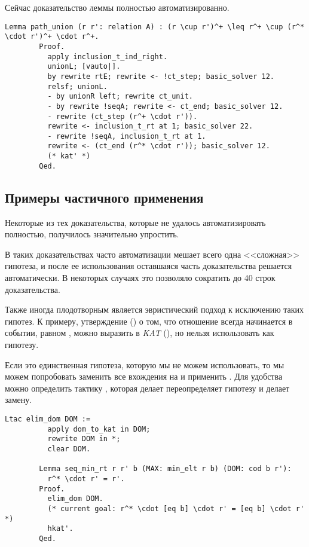 \documentclass[times
              ]{itmo-student-thesis}
\begin{document}
      Сейчас доказательство леммы полностью автоматизированно.

      \begin{lstlisting}[float=false, gobble=8, label={lst:path_union},
        caption={Автоматизация сложных преобразований}]
        Lemma path_union (r r': relation A) : (r \cup r')^+ \leq r^+ \cup (r^* \cdot r')^+ \cdot r^+.
        Proof.
          apply inclusion_t_ind_right.
          unionL; [vauto|].
          by rewrite rtE; rewrite <- !ct_step; basic_solver 12.
          relsf; unionL.
          - by unionR left; rewrite ct_unit.
          - by rewrite !seqA; rewrite <- ct_end; basic_solver 12.
          - rewrite (ct_step (r^+ \cdot r')).
          rewrite <- inclusion_t_rt at 1; basic_solver 22.
          - rewrite !seqA, inclusion_t_rt at 1.
          rewrite <- (ct_end (r^* \cdot r')); basic_solver 12.
          (* kat' *)
        Qed.
      \end{lstlisting}

    \subsection{Примеры частичного применения }
      Некоторые из тех доказательства, которые не удалось автоматизировать полностью, получилось
      значительно упростить.

      В таких доказательствах часто автоматизации мешает всего одна <<сложная>> гипотеза,
      и после ее использования оставшаяся часть доказательства решается автоматически. В некоторых
      случаях это позволяло сократить до 40 строк доказательства.

      Также иногда плодотворным является эвристический подход к исключению таких гипотез.
      К примеру, утверждение () о том, что отношение  всегда начинается в
      событии, равном , можно выразить в \textit{KAT} (), но нельзя
      использовать как гипотезу.

      Если это единственная гипотеза, которую мы не можем использовать, то мы можем попробовать
      заменить все вхождения  на
       и применить . Для удобства можно определить тактику ,
      которая делает переопределяет гипотезу и делает замену.

      \begin{lstlisting}[float=false, gobble=8, label={lst:dom}]
        Ltac elim_dom DOM :=
          apply dom_to_kat in DOM;
          rewrite DOM in *;
          clear DOM.

        Lemma seq_min_rt r r' b (MAX: min_elt r b) (DOM: cod b r'):
          r^* \cdot r' = r'.
        Proof.
          elim_dom DOM.
          (* current goal: r^* \cdot [eq b] \cdot r' = [eq b] \cdot r' *)
          hkat'.
        Qed.
      \end{lstlisting}
\end{document}
